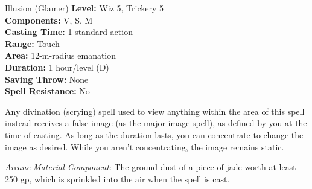{Illusion (Glamer)}
{
	\textbf{Level:}
	Wiz 5, Trickery 5\\
	\textbf{Components:}
	V, S, M\\
	\textbf{Casting Time:}
	1 standard action\\
	\textbf{Range:}
	Touch\\
	\textbf{Area:}
	12-m-radius emanation\\
	\textbf{Duration:}
	1 hour/level (D)\\
	\textbf{Saving Throw:}
	None\\
	\textbf{Spell Resistance:}
	No\\
}
{
	Any divination (scrying) spell used to view anything within the area of this spell instead receives a false image (as the major image spell), as defined by you at the time of casting. As long as the duration lasts, you can concentrate to change the image as desired. While you aren't concentrating, the image remains static.

	\textit{Arcane Material Component}:
	The ground dust of a piece of jade worth at least 250 gp, which is sprinkled into the air when the spell is cast.

}
